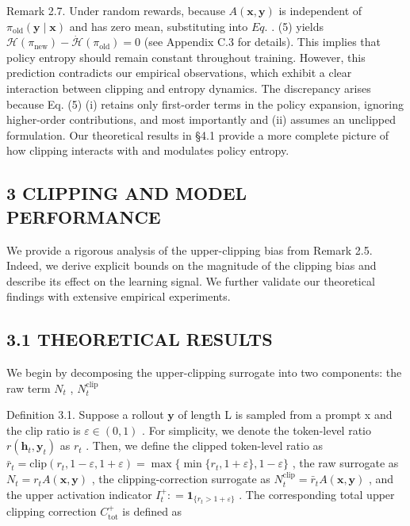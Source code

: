 \documentclass[
  10
]{article}
\begin{document}
Remark 2.7. Under random rewards, because
\(A ( \mathbf { x } , \mathbf { y } )\) is independent of
\(\pi _ { \mathrm { o l d } } ( \mathbf { y } \mid \mathbf { x } )\) and
has zero mean, substituting into \(E q .\) . (5) yields
\(\mathcal { H } ( \pi _ { \mathrm { n e w } } ) - \dot { \mathcal { H } } ( \pi _ { \mathrm { o l d } } ) = 0\)
(see Appendix C.3 for details). This implies that policy entropy should
remain constant throughout training. However, this prediction
contradicts our empirical observations, which exhibit a clear
interaction between clipping and entropy dynamics. The discrepancy
arises because Eq. (5) (i) retains only first-order terms in the policy
expansion, ignoring higher-order contributions, and most importantly and
(ii) assumes an unclipped formulation. Our theoretical results in §4.1
provide a more complete picture of how clipping interacts with and
modulates policy entropy.

\subsection{3 CLIPPING AND MODEL
PERFORMANCE}\label{clipping-and-model-performance}

We provide a rigorous analysis of the upper-clipping bias from Remark
2.5. Indeed, we derive explicit bounds on the magnitude of the clipping
bias and describe its effect on the learning signal. We further validate
our theoretical findings with extensive empirical experiments.

\subsection{3.1 THEORETICAL RESULTS}\label{theoretical-results}

We begin by decomposing the upper-clipping surrogate into two
components: the raw term \(N _ { t }\) ,
\(N _ { t } ^ { \mathrm { c l i p } }\)

Definition 3.1. Suppose a rollout \(\mathbf { y }\) of length L is
sampled from a prompt x and the clip ratio is
\(\varepsilon \in ( 0 , 1 )\) . For simplicity, we denote the
token-level ratio
\(r ( \mathbf { h } _ { t } , \mathbf { y } _ { t } )\) as \(r _ { t }\)
. Then, we define the clipped token-level ratio as
\(\bar { r } _ { t } = \mathrm { c l i p } ( r _ { t } , 1 - \varepsilon , 1 + \varepsilon ) = \operatorname* { m a x } \{ \operatorname* { m i n } \{ r _ { t } , 1 + \varepsilon \} , 1 - \varepsilon \}\)
, the raw surrogate as
\(N _ { t } = r _ { t } A ( \mathbf { x } , \mathbf { y } )\) , the
clipping-correction surrogate as
\(N _ { t } ^ { \mathrm { c l i p } } = \bar { r } _ { t } A ( \mathbf { x } , \mathbf { y } )\)
, and the upper activation indicator
\(I _ { t } ^ { + } : = \mathbf { 1 } _ { \{ r _ { t } > 1 + \varepsilon \} }\)
. The corresponding total upper clipping correction
\(C _ { \mathrm { t o t } } ^ { + }\) is defined as
\end{document}
